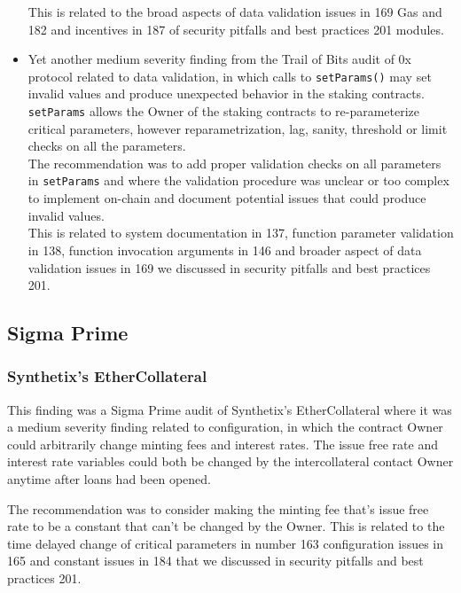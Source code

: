 \begin{itemize}
  This is related to the broad aspects of data validation issues in 169
  Gas and 182 and incentives in 187 of security pitfalls and best
  practices 201 modules.
\item
  Yet another medium severity finding from the Trail of Bits audit of 0x
  protocol related to data validation, in which calls to
  \texttt{setParams()} may set invalid values and produce unexpected
  behavior in the staking contracts.\\

  \texttt{setParams} allows the Owner of the staking contracts to
  re-parameterize critical parameters, however reparametrization, lag,
  sanity, threshold or limit checks on all the parameters.\\

  The recommendation was to add proper validation checks on all
  parameters in \texttt{setParams} and where the validation procedure
  was unclear or too complex to implement on-chain and document
  potential issues that could produce invalid values.\\

  This is related to system documentation in 137, function parameter
  validation in 138, function invocation arguments in 146 and broader
  aspect of data validation issues in 169 we discussed in security
  pitfalls and best practices 201.
\end{itemize}

\subsection{Sigma Prime}\label{sigma-prime}

\subsubsection{Synthetix's
EtherCollateral}\label{synthetixs-ethercollateral}

This finding was a Sigma Prime audit of Synthetix's EtherCollateral
where it was a medium severity finding related to configuration, in
which the contract Owner could arbitrarily change minting fees and
interest rates. The issue free rate and interest rate variables could
both be changed by the intercollateral contact Owner anytime after loans
had been opened.

The recommendation was to consider making the minting fee that's issue
free rate to be a constant that can't be changed by the Owner. This is
related to the time delayed change of critical parameters in number 163
configuration issues in 165 and constant issues in 184 that we discussed
in security pitfalls and best practices 201.

